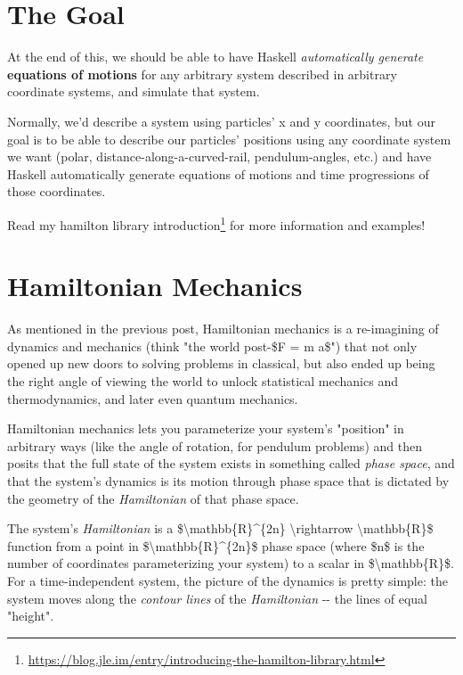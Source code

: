\documentclass[]{article}
\renewcommand{\href}[2]{#2\footnote{\url{#1}}}
\begin{document}
\section{The Goal}

At the end of this, we should be able to have Haskell \emph{automatically
generate} \textbf{equations of motions} for any arbitrary system described in
arbitrary coordinate systems, and simulate that system.

Normally, we'd describe a system using particles' x and y coordinates, but our
goal is to be able to describe our particles' positions using any coordinate
system we want (polar, distance-along-a-curved-rail, pendulum-angles, etc.) and
have Haskell automatically generate equations of motions and time progressions
of those coordinates.

Read \href{https://blog.jle.im/entry/introducing-the-hamilton-library.html}{my
hamilton library introduction} for more information and examples!

\section{Hamiltonian Mechanics}

As mentioned in the previous post, Hamiltonian mechanics is a re-imagining of
dynamics and mechanics (think "the world post-\$F = m a\$") that not only opened
up new doors to solving problems in classical, but also ended up being the right
angle of viewing the world to unlock statistical mechanics and thermodynamics,
and later even quantum mechanics.

Hamiltonian mechanics lets you parameterize your system's "position" in
arbitrary ways (like the angle of rotation, for pendulum problems) and then
posits that the full state of the system exists in something called \emph{phase
space}, and that the system's dynamics is its motion through phase space that is
dictated by the geometry of the \emph{Hamiltonian} of that phase space.

The system's \emph{Hamiltonian} is a \$\textbackslash{}mathbb\{R\}\^{}\{2n\}
\textbackslash{}rightarrow \textbackslash{}mathbb\{R\}\$ function from a point
in \$\textbackslash{}mathbb\{R\}\^{}\{2n\}\$ phase space (where \$n\$ is the
number of coordinates parameterizing your system) to a scalar in
\$\textbackslash{}mathbb\{R\}\$. For a time-independent system, the picture of
the dynamics is pretty simple: the system moves along the \emph{contour lines}
of the \emph{Hamiltonian} -\/- the lines of equal "height".
\end{document}

